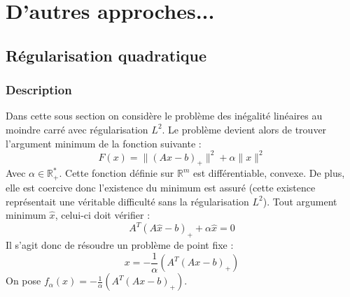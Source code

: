 \documentclass[10pt,a4paper]{article}
\begin{document}
\section{D'autres approches...}

\subsection{Régularisation quadratique}
\subsubsection{Description}
Dans cette sous section on considère le problème des inégalité linéaires au moindre carré avec régularisation $L^2$.
Le problème devient alors de trouver l'argument minimum de la fonction suivante :
\begin{equation}
F(x) = \| (Ax-b)_+ \|^2+ \alpha \| x\|^2
\end{equation}
Avec $\alpha \in \mathbb{R}_+^*$.
Cette fonction définie sur $\mathbb{R}^m$ est différentiable, convexe.
De plus, elle est coercive donc l'existence du minimum est assuré (cette existence représentait une véritable difficulté sans la régularisation $L^2$).
Tout argument minimum $\hat{x}$, celui-ci doit vérifier :
\begin{equation}
A^T(A \hat{x}-b)_+ + \alpha \hat{x}=0
\end{equation}
Il s'agit donc de résoudre un problème de point fixe :
\begin{equation}
x=-\frac{1}{\alpha}\left( A^T(Ax-b)_+\right)
\end{equation}
On pose $f_{\alpha}(x)=-\frac{1}{\alpha}\left( A^T(Ax-b)_+\right)$.
\end{document}
